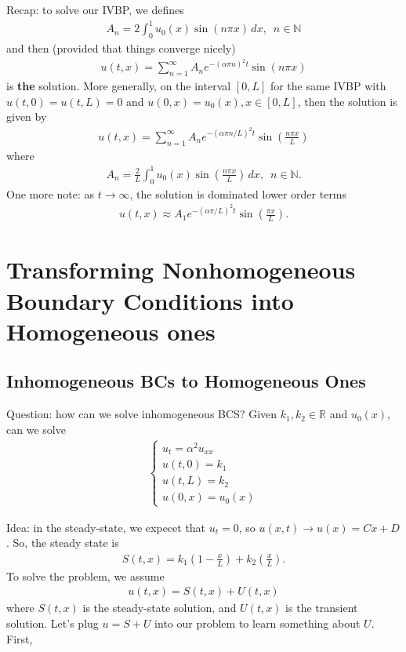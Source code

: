 \documentclass{article}
\theoremstyle{definition}
\newcommand{\R}{\mathbb{R}}
\begin{document}
Recap: to solve our IVBP, we defines 
\begin{align*}
A_n = 2\int_{0}^1 u_0(x)\sin(n\pi x)\,dx, \,\,\, n\in \mathbb{N}
\end{align*}
and then (provided that things converge nicely)
\begin{align*}
u(t,x) = \sum_{n=1}^\infty A_n e^{-(\alpha \pi n)^2 t}\sin(n\pi x)
\end{align*}
is \textbf{the} solution. More generally, on the interval $[0,L]$ for the same IVBP with $u(t,0) = u(t,L) = 0$ and $u(0,x) = u_0(x), x\in[0,L]$, then the solution is given by
\begin{align*}
u(t,x) = \sum_{n=1}^\infty A_n e^{-(\alpha \pi n/L)^2 t}\sin\left(\frac{n\pi x}{L}\right)
\end{align*}
where 
\begin{align*}
A_n = \frac{2}{L}\int_{0}^1 u_0(x)\sin\left(\frac{n\pi x}{L}\right)\,dx, \,\,\, n\in \mathbb{N}.
\end{align*}
One more note: as $t\to \infty$, the solution is dominated lower order terms
\begin{align*}
u(t,x)\approx A_1 e^{-(\alpha \pi/L)^2 t}\sin\left(\frac{\pi x}{L}\right).
\end{align*}





\newpage
\section{Transforming Nonhomogeneous Boundary Conditions into Homogeneous ones }

\subsection{Inhomogeneous BCs to Homogeneous Ones}

Question: how can we solve inhomogeneous BCS? Given $k_1,k_2\in\R$ and $u_0(x)$, can we solve
\begin{align*}
\begin{cases}
u_t = \alpha^2u_{xx}\\
u(t,0) = k_1\\
u(t,L) = k_2\\
u(0,x) = u_0(x)
\end{cases}
\end{align*}

Idea: in the steady-state, we expecet that $u_t = 0$, so $u(x,t) \to u(x) = Cx+D$. So, the steady state is
\begin{align*}
S(t,x) = k_1\left( 1 - \frac{x}{L} \right) + k_2\left(\frac{x}{L} \right).
\end{align*}
To solve the problem, we assume 
\begin{align*}
u(t,x) = S(t,x) + U(t,x)
\end{align*}
where $S(t,x)$ is the steady-state solution, and $U(t,x)$ is the transient solution. Let's plug $u = S+U$ into our problem to learn something about $U$. First, 
\end{document}
